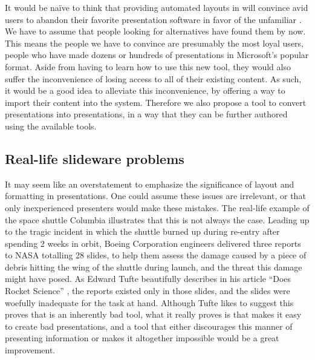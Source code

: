    It would be na\"ive to think that providing automated layouts in \mxp will
   convince avid \ppt users to abandon their favorite presentation software in
   favor of the unfamiliar \mxp. We have to assume that people looking for
   alternatives have found them by now. This means the people we have to
   convince are presumably the most loyal \ppt users, people who have made
   dozens or hundreds of presentations in Microsoft's popular format. Aside
   from having to learn how to use this new tool, they would also suffer the
   inconvenience of losing access to all of their existing content. As such, it
   would be a good idea to alleviate this inconvenience, by offering a way to
   import their content into the \mxp system. Therefore we also propose a tool
   to convert \ppt presentations into \mxp presentations, in a way that they
   can be further authored using the available \mxp tools.

   \subsection{Real-life slideware problems}
    \label{nasa}

    It may seem like an overstatement to emphasize the significance of layout
    and formatting in presentations. One could assume these issues are
    irrelevant, or that only inexperienced presenters would make these mistakes.
    The real-life example of the space shuttle Columbia illustrates that this is
    not always the case. Leading up to the tragic incident in which the shuttle
    burned up during re-entry after spending 2 weeks in orbit, Boeing
    Corporation engineers delivered three reports to {NASA} totalling 28 \ppt
    slides, to help them assess the damage caused by a piece of debris hitting
    the wing of the shuttle during launch, and the threat this damage might have
    posed. As Edward Tufte beautifully describes in his article ``\ppt Does
    Rocket Science'' \citep{tufte-2}, the reports existed only in those slides,
    and the slides were woefully inadequate for the task at hand. Although Tufte
    likes to suggest this proves that \ppt is an inherently bad tool, what it
    really proves is that \ppt makes it easy to create bad presentations, and a
    tool that either discourages this manner of presenting information or makes
    it altogether impossible would be a great improvement.

